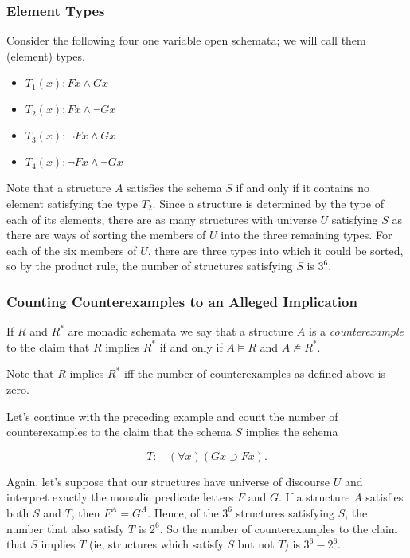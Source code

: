\subsubsection*{Element Types}

Consider the following four one variable open schemata; we will call them (element) types.
\begin{itemize}
\item $T_1(x): Fx \wedge Gx$
\item $T_2(x): Fx \wedge \neg Gx$
\item $T_3(x): \neg Fx\wedge Gx$
\item $T_4(x): \neg Fx\wedge \neg Gx$
\end{itemize}
Note that a structure $A$ satisfies the schema $S$ if and only if it contains no element satisfying the type $T_2$. Since a structure is determined by the type of each of its elements, there are as many structures with universe $U$ satisfying $S$ as there are ways of sorting the members of $U$ into the three remaining types. For each of the six members of $U$, there are three types into which it could be sorted, so by the product rule, the number of structures satisfying $S$ is $3^6$.


\subsubsection*{Counting Counterexamples to an Alleged Implication}
If $R$ and $R^*$ are monadic schemata we say that a structure $A$ is a \emph{counterexample} to the claim that $R$ implies $R^*$ if and only if $A\models R$ and $A\not\models R^*$.

\begin{aside}
    Note that $R$ implies $R^*$ iff the number of counterexamples as defined above is zero.
\end{aside}

Let's continue with the preceding example and count the number of counterexamples to the claim that the schema $S$ implies the schema

\[T:\ \ \ \ (\forall x)(Gx\supset Fx).\]

Again, let's suppose that our structures have universe of discourse $U$ and interpret exactly the monadic predicate letters $F$ and $G$. If a structure $A$ satisfies both $S$ and $T$, then $F^A=G^A$. Hence, of the $3^6$ structures satisfying $S$, the number that also satisfy $T$ is $2^6$. So the number of counterexamples to the claim that $S$ implies $T$ (ie, structures which satisfy $S$ but not $T$) is $3^6 - 2^6$.  
